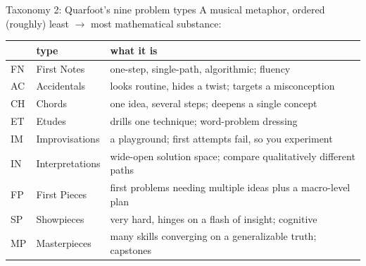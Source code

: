 \documentclass[10pt,aspectratio=169]{beamer}
\begin{document}
\begin{frame}{Taxonomy 2: Quarfoot's nine problem types}
  A musical metaphor, ordered (roughly) least $\to$ most mathematical substance:
  \medskip
  \begin{center}
    \small
    \begin{tabular}{llp{}}
      \toprule
      & type & what it is \\
      \midrule
      FN & First Notes & one-step, single-path, algorithmic; fluency \\
      AC & Accidentals & looks routine, hides a twist; targets a misconception \\
      CH & Chords & one idea, several steps; deepens a single concept \\
      ET & Etudes & drills one technique; word-problem dressing \\
      IM & Improvisations & a playground; first attempts fail, so you experiment \\
      IN & Interpretations & wide-open solution space; compare qualitatively different paths \\
      FP & First Pieces & first problems needing multiple ideas plus a macro-level plan \\
      SP & Showpieces & very hard, hinges on a flash of insight; cognitive \\
      MP & Masterpieces & many skills converging on a generalizable truth; capstones \\
      \bottomrule
    \end{tabular}
  \end{center}
\end{frame}
\end{document}
